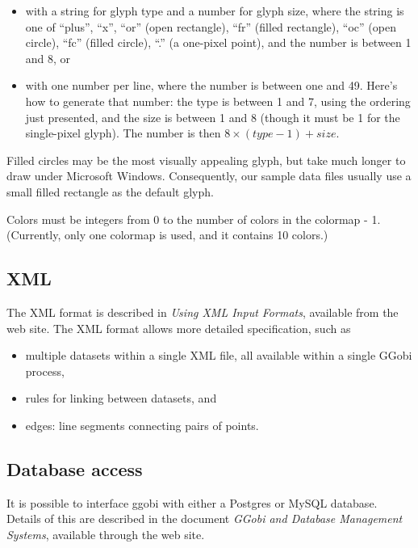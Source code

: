 \documentclass[11pt]{article}
\begin{document}
\begin{itemize}
\item with a string for glyph type and a number for glyph size, where
the string is one of ``plus'', ``x'', ``or'' (open rectangle), ``fr''
(filled rectangle), ``oc'' (open circle), ``fc'' (filled circle),
``.'' (a one-pixel point), and the number is between 1 and 8, or
\item with one number per line, where the number is between one and
49.  Here's how to generate that number: the type is between 1 and 7,
using the ordering just presented, and the size is between 1 and 8
(though it must be 1 for the single-pixel glyph).  The number is then
$8 \times (type-1) + size$.
\end{itemize}

Filled circles may be the most visually appealing glyph, but take
much longer to draw under Microsoft Windows.  Consequently, our
sample data files usually use a small filled rectangle as the default
glyph.

Colors must be integers from 0 to the number of colors in
the colormap - 1.  (Currently, only one colormap is used, and it
contains 10 colors.)

\subsection {XML}
\label{slbl:XML}

The XML format is described in {\em Using XML Input Formats},
available from the web site.  The XML format allows more detailed
specification, such as

\begin{itemize}
\item multiple datasets within a single XML file, all available within
      a single GGobi process,
\item rules for linking between datasets, and
\item edges: line segments connecting pairs of points.
\end{itemize}

\subsection {Database access}
\label{slbl:MySQL}

It is possible to interface ggobi with either a Postgres or MySQL
database. Details of this are described in the document {\em GGobi and
  Database Management Systems}, available through the web site. 
\end{document}
